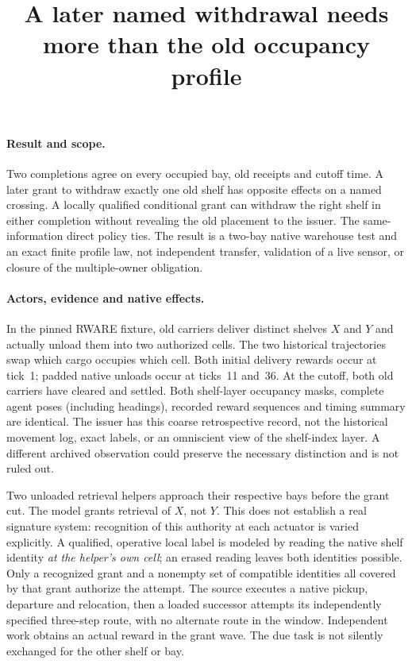\documentclass[11pt]{article}
\title{A later named withdrawal needs more than the old occupancy profile}
\date{}
\begin{document}
\maketitle

\paragraph{Result and scope.}
Two completions agree on every occupied bay, old receipts and cutoff
time. A later grant to withdraw exactly one old shelf has opposite
effects on a named crossing. A locally qualified conditional grant
can withdraw the right shelf in either completion without revealing
the old placement to the issuer. The same-information direct policy
ties. The result is a two-bay native warehouse test and an exact
finite profile law, not independent transfer, validation of a live
sensor, or closure of the multiple-owner obligation.

\paragraph{Actors, evidence and native effects.}
In the pinned RWARE fixture, old carriers deliver distinct shelves $X$
and $Y$ and actually unload them into two authorized cells. The two
historical trajectories swap which cargo occupies which cell. Both
initial delivery rewards occur at tick~1; padded native unloads occur
at ticks~11 and~36. At the cutoff, both old carriers have cleared and
settled. Both shelf-layer occupancy masks, complete agent poses
(including headings), recorded reward sequences and timing summary
are identical. The issuer has this coarse retrospective record, not
the historical movement log, exact labels, or an omniscient view of
the shelf-index layer. A different archived observation could
preserve the necessary distinction and is not ruled out.

Two unloaded retrieval helpers approach their respective bays
before the grant cut. The model grants retrieval of $X$, not $Y$.
This does not establish a real signature system: recognition of this
authority at each actuator is varied explicitly. A qualified,
operative local label is modeled by reading the native shelf identity
\emph{at the helper's own cell}; an erased reading leaves both
identities possible. Only a recognized grant and a nonempty set of
compatible identities all covered by that grant authorize the
attempt. The source executes a native pickup, departure and
relocation, then a loaded successor attempts its independently
specified three-step route, with no alternate route in the window.
Independent work obtains an actual reward in the grant wave.
The due task is not silently exchanged for the other shelf or bay.
\end{document}
